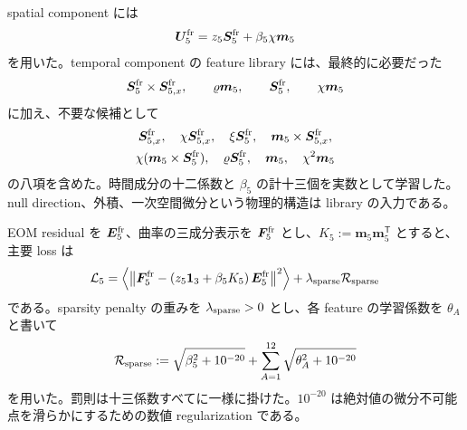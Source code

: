 spatial component には
\begin{equation}
\boldsymbol U_{5}^{\rm fr}
=z_5\boldsymbol S_5^{\rm fr}+\beta_5\chi\boldsymbol m_5
\label{eq:ml5-U}
\end{equation}
を用いた。temporal component の feature library には、最終的に必要だった
\begin{equation}
\boldsymbol S_5^{\rm fr}\times\boldsymbol S_{5,x}^{\rm fr},
\qquad
\varrho\boldsymbol m_5,
\qquad
\boldsymbol S_5^{\rm fr},
\qquad
\chi\boldsymbol m_5
\label{eq:ml5-physical-features}
\end{equation}
に加え、不要な候補として
\begin{equation}
\begin{gathered}
\boldsymbol S_{5,x}^{\rm fr},\quad
\chi\boldsymbol S_{5,x}^{\rm fr},\quad
\xi\boldsymbol S_5^{\rm fr},\quad
\boldsymbol m_5\times\boldsymbol S_{5,x}^{\rm fr},\\
\chi(\boldsymbol m_5\times\boldsymbol S_5^{\rm fr}),\quad
\varrho\boldsymbol S_5^{\rm fr},\quad
\boldsymbol m_5,\quad
\chi^2\boldsymbol m_5
\end{gathered}
\label{eq:ml5-distractors}
\end{equation}
の八項を含めた。時間成分の十二係数と $\beta_5$ の計十三個を実数として学習した。null direction、外積、一次空間微分という物理的構造は library の入力である。

EOM residual を $\boldsymbol E_5^{\rm fr}$、曲率の三成分表示を $\boldsymbol F_5^{\rm fr}$ とし、$K_5:=\boldsymbol m_5\boldsymbol m_5^{\mathsf T}$ とすると、主要 loss は
\begin{equation}
\mathcal L_5
=
\left\langle
\left\|
\boldsymbol F_5^{\rm fr}
-\left(z_5\mathbf 1_{3}+\beta_5K_5\right)
\boldsymbol E_5^{\rm fr}
\right\|^2
\right\rangle
+\lambda_{\rm sparse}\mathcal R_{\rm sparse}
\label{eq:ML5loss}
\end{equation}
である。sparsity penalty の重みを $\lambda_{\rm sparse}>0$ とし、各 feature の学習係数を $\theta_A$ と書いて
\begin{equation}
\mathcal R_{\rm sparse}
:=
\sqrt{\beta_5^2+10^{-20}}
+\sum_{A=1}^{12}\sqrt{\theta_A^2+10^{-20}}
\label{eq:ml5-sparse}
\end{equation}
を用いた。罰則は十三係数すべてに一様に掛けた。$10^{-20}$ は絶対値の微分不可能点を滑らかにするための数値 regularization である。

